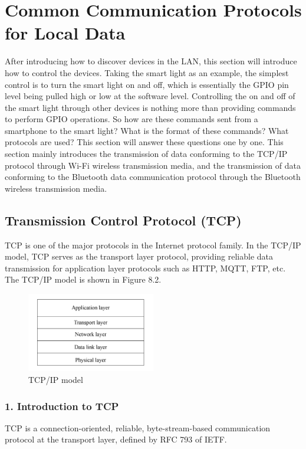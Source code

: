\documentclass[a4paper,12pt,openany]{book}
\begin{document}
\section{Common Communication Protocols for Local Data}
After introducing how to discover devices in the LAN, this section will introduce how to control the devices. Taking the smart light as an example, the simplest control is to turn the smart light on and off, which is essentially the GPIO pin level being pulled high or low at the software level. Controlling the on and off of the smart light through other devices is nothing more than providing commands to perform GPIO operations. So how are these commands sent from a smartphone to the smart light? What is the format of these commands? What protocols are used? This section will answer these questions one by one. This section mainly introduces the transmission of data conforming to the TCP/IP protocol through Wi-Fi wireless transmission media, and the transmission of data conforming to the Bluetooth data communication protocol through the Bluetooth wireless transmission media.

\subsection{Transmission Control Protocol (TCP)}

TCP is one of the major protocols in the Internet protocol family. In the TCP/IP model, TCP serves as the transport layer protocol, providing reliable data transmission for application layer protocols such as HTTP, MQTT, FTP, etc. The TCP/IP model is shown in Figure 8.2.

\begin{figure}[!h]
    \centering
    \includegraphics[width=0.5\textwidth]{D8Z/8-2}
    \caption{TCP/IP model}
\end{figure}

\subsubsection{1. Introduction to TCP}
TCP is a connection-oriented, reliable, byte-stream-based communication protocol at the transport layer, defined by RFC 793 of IETF.
\end{document}
